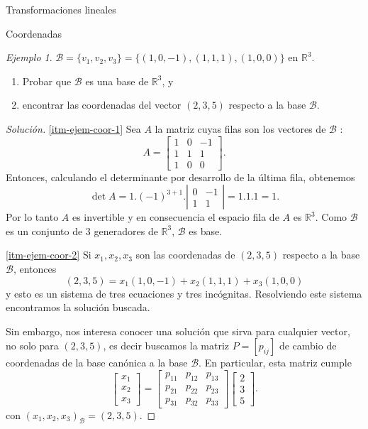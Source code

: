 \documentclass[a4paper,12pt,twoside,spanish,reqno]{amsbook}
\numberwithin{equation}{section}
\theoremstyle{definition}
\theoremstyle{remark}
\newtheorem*{ejemplo*}{Ejemplo}
\newcommand{\R}{\mathbb R}
\begin{document}
\begin{chapter}{Transformaciones lineales}
\begin{section}{Coordenadas}
    
    \begin{ejemplo*}
         $\mathcal{B} = \{v_1,v_2,v_3 \}=\{(1,0,-1),(1,1,1),(1,0,0) \}$ en $\R^3$.
        \begin{enumerate}
            \item\label{itm-ejem-coor-1} Probar que $\mathcal{B}$ es una base de $\R^3$, y 
            \item\label{itm-ejem-coor-2} encontrar las coordenadas del vector  $(2,3,5)$ respecto a la base  $\mathcal{B}$. 
        \end{enumerate}
    \end{ejemplo*}
\begin{proof}[Solución]
    \ref{itm-ejem-coor-1} Sea $A$ la matriz cuyas filas son los vectores de $\mathcal{B}$ :
    $$
    A = \begin{bmatrix} 1&0&-1\\1&1&1\\1&0&0	\end{bmatrix}.
    $$
    Entonces,  calculando el determinante  por desarrollo de la última fila, obtenemos
    $$
    \det A = 1.(-1)^{3+1}. 
    \left| \begin{matrix} 0&-1\\1&1	\end{matrix} \right| = 1.1.1 =1.
    $$ 
    Por  lo tanto $A$ es invertible y en consecuencia el espacio fila de $A$ es $\R^3$. Como $\mathcal{B}$ es un conjunto de 3  generadores de  $\R^3$, $\mathcal{B}$ es base.
    
    \ref{itm-ejem-coor-2} Si $x_1,x_2,x_3$  son las coordenadas de $(2,3,5)$ respecto a la base  $\mathcal{B}$, entonces
    $$
    (2,3,5) = x_1(1,0,-1)+x_2(1,1,1)+x_3(1,0,0)
    $$
    y esto es un sistema de tres ecuaciones y tres incógnitas.  Resolviendo este sistema encontramos la solución buscada. 
    
    Sin embargo,  nos interesa conocer una solución que sirva para cualquier vector, no solo para $(2,3,5)$, es decir buscamos la matriz $P = [p_{ij}]$ de cambio de coordenadas de la base canónica a la base $\mathcal B$. En particular,  esta matriz cumple 
    $$
    \begin{bmatrix} x_1\\x_2\\x_3 \end{bmatrix} = 
    \begin{bmatrix}p_{11} &p_{12}& p_{13} \\p_{21} &p_{22} & p_{23}\\ p_{31} &p_{32}& p_{33}\end{bmatrix}
    \begin{bmatrix} 2\\3\\5 \end{bmatrix}.
    $$
    con $(x_1,x_2,x_3)_{\mathcal B} = (2,3,5)$.
    

\end{proof}
\end{section}
\end{chapter}
\end{document}
